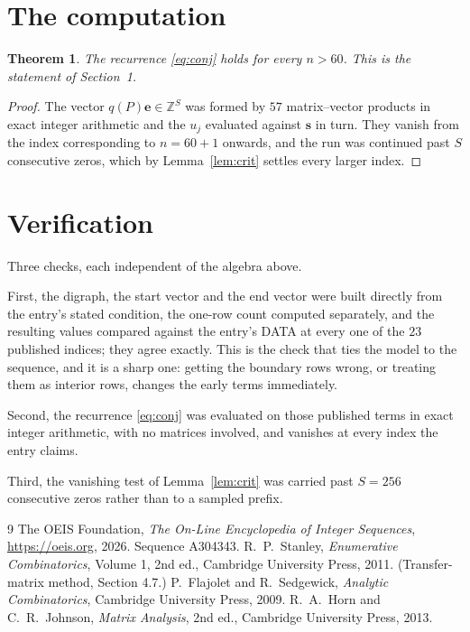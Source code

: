 \documentclass[11pt,a4paper]{article}
\theoremstyle{plain}
\newtheorem{theorem}{Theorem}
\theoremstyle{definition}
\begin{document}
\section{The computation}

\begin{theorem}
The recurrence \eqref{eq:conj} holds for every $n>60$. This is the statement of
Section~1.
\end{theorem}

\begin{proof}
The vector $q(P)\mathbf{e}\in\mathbb{Z}^{S}$ was formed by $57$ matrix--vector
products in exact integer arithmetic and the $u_j$ evaluated against $\mathbf{s}$ in turn.
They vanish from the index corresponding to $n=60+1$ onwards, and the run was continued
past $S$ consecutive zeros, which by Lemma~\ref{lem:crit} settles every larger index.
\end{proof}

\section{Verification}

Three checks, each independent of the algebra above.

First, the digraph, the start vector and the end vector were built directly from the
entry's stated condition, the one-row count computed separately, and the resulting values
compared against the entry's DATA at every one of the $23$ published indices; they
agree exactly. This is the check that ties the model to the sequence, and it is a sharp one:
getting the boundary rows wrong, or treating them as interior rows, changes the early terms
immediately.

Second, the recurrence \eqref{eq:conj} was evaluated on those published terms in exact
integer arithmetic, with no matrices involved, and vanishes at every index the entry claims.

Third, the vanishing test of Lemma~\ref{lem:crit} was carried past $S=256$ consecutive
zeros rather than to a sampled prefix.

\begin{thebibliography}{9}
 The OEIS Foundation, \emph{The On-Line Encyclopedia of Integer
Sequences}, \url{https://oeis.org}, 2026. Sequence A304343.
 R.~P.~Stanley, \emph{Enumerative Combinatorics}, Volume 1, 2nd ed.,
Cambridge University Press, 2011. (Transfer-matrix method, Section 4.7.)
 P.~Flajolet and R.~Sedgewick, \emph{Analytic Combinatorics}, Cambridge
University Press, 2009.
 R.~A.~Horn and C.~R.~Johnson, \emph{Matrix Analysis}, 2nd ed., Cambridge
University Press, 2013.
\end{thebibliography}
\end{document}
